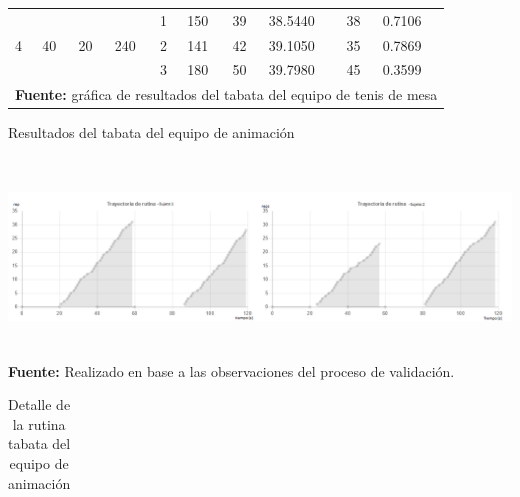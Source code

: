 \begin{landscape}
\begin{table}[H]
\begin{center}
\begin{tabular}{|l|l|l|l|l|l|l|l|l|l|}
\multirow{3}{*}{4} & \multirow{3}{*}{40} & \multirow{3}{*}{20} & \multirow{3}{*}{240} & 1 & 150 & 39 & 38.5440 & 38 & 0.7106 \\ \cline{5-10} 
 &  &  &  & 2 & 141 & 42 & 39.1050 & 35 & 0.7869 \\ \cline{5-10} 
 &  &  &  & 3 & 180 & 50 & 39.7980 & 45 & 0.3599 \\ \hline
 \multicolumn{10}{l}{\textbf{Fuente:} gr\'afica de resultados del tabata del equipo de tenis de mesa}
\end{tabular}
\end{center}
\end{table}
\begin{chart}[H]
	\caption{Resultados del tabata del equipo de animaci\'on}
	\label{fig:resTabCheerleader}
	\centering
	\includegraphics[width=610px,height=200px]{graphics/resultados/ResultRecognitionCheerleader.png} \\
	\textbf{Fuente:} Realizado en base a las observaciones del proceso de validaci\'on.
\end{chart}
\begin{table}[H]
\begin{center}
\caption{Detalle de la rutina tabata del equipo de animaci\'on}
\label{tab:detailResultsCheerleader}
\begin{tabular}{|l|l|l|l|l|l|l|l|l|l|}
\hline

\end{tabular}
\end{center}
\end{table}
\end{landscape}
